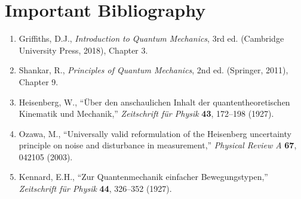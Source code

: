 \documentclass[11pt,openright]{book}
\begin{document}
\section*{Important Bibliography}
\begin{enumerate}
\item Griffiths, D.J., \textit{Introduction to Quantum Mechanics}, 3rd ed. (Cambridge University Press, 2018), Chapter 3.
\item Shankar, R., \textit{Principles of Quantum Mechanics}, 2nd ed. (Springer, 2011), Chapter 9.
\item Heisenberg, W., ``Über den anschaulichen Inhalt der quantentheoretischen Kinematik und Mechanik,'' \textit{Zeitschrift für Physik} \textbf{43}, 172--198 (1927).
\item Ozawa, M., ``Universally valid reformulation of the Heisenberg uncertainty principle on noise and disturbance in measurement,'' \textit{Physical Review A} \textbf{67}, 042105 (2003).
\item Kennard, E.H., ``Zur Quantenmechanik einfacher Bewegungstypen,'' \textit{Zeitschrift für Physik} \textbf{44}, 326--352 (1927).
\end{enumerate}

\end{document}
